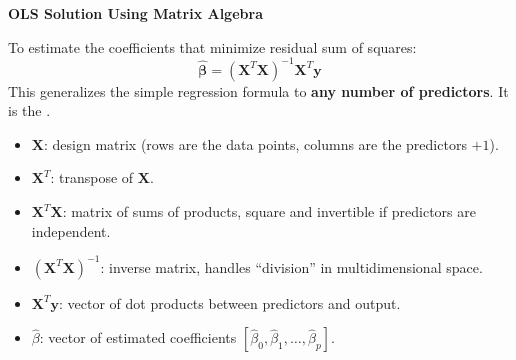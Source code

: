 \highspace
\begin{flushleft}
    \textcolor{Green3}{ \textbf{OLS Solution Using Matrix Algebra}}
\end{flushleft}
To estimate the coefficients that minimize residual sum of squares:
\begin{equation}
    \hat{\boldsymbol{\beta}} = (\mathbf{X}^{T} \mathbf{X})^{-1} \mathbf{X}^{T} \mathbf{y}    
\end{equation}
This generalizes the simple regression formula to \textbf{any number of predictors}. It is the .
\begin{itemize}
    \item $\mathbf{X}$: design matrix (rows are the data points, columns are the predictors $+1$).
    \item $\mathbf{X}^{T}$: transpose of $\mathbf{X}$.
    \item $\mathbf{X}^{T}\mathbf{X}$: matrix of sums of products, square and invertible if predictors are independent.
    \item $\left(\mathbf{X}^{T}\mathbf{X}\right)^{-1}$: inverse matrix, handles ``division'' in multidimensional space.
    \item $\mathbf{X}^{T}\mathbf{y}$: vector of dot products between predictors and output.
    \item $\hat{\beta}$: vector of estimated coefficients $\left[\hat{\beta}_0, \hat{\beta}_1, \dots, \hat{\beta}_p\right]$.
\end{itemize}

